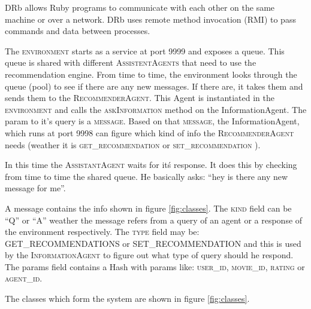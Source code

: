 \documentclass[11pt,a4paper]{article} %
\begin{document}
DRb allows Ruby programs to communicate with each other on the same machine or over a network. DRb uses remote method invocation (RMI) to pass commands and data between processes.

The \textsc{environment} starts as a service at port 9999 and exposes a queue. This queue is shared with different \textsc{AssistentAgents} that need to use the recommendation engine. From time to time, the environment looks through the queue (pool) to see if there are any new messages. If there are, it takes them and sends them to the \textsc{RecommenderAgent}. This Agent is instantiated in the \textsc{environment} and calls the \textsc{askInformation} method on the InformationAgent. The param to it's query is a \textsc{message}. Based on that \textsc{message}, the InformationAgent, which runs at port 9998 can figure which kind of info the \textsc{RecommenderAgent} needs (weather it is \textsc{get\_recommendation} or \textsc{set\_recommendation} ).

In this time the \textsc{AssistantAgent} waits for it\'s response. It does this by checking from time to time the shared queue. He basically asks: ``hey is there any new message for me''.

A message contains the info shown in figure \ref{fig:classes}. The \textsc{kind} field can be ``Q'' or ``A'' weather the message refers from a query of an agent or a response of the environment respectively. The \textsc{type} field may be: \textsc{GET\_RECOMMENDATIONS} or \textsc{SET\_RECOMMENDATION} and this is used by the \textsc{InformationAgent} to figure out what type of query should he respond. The params field contains a Hash with params like: \textsc{user\_id}, \textsc{movie\_id}, \textsc{rating} or \textsc{agent\_id}.

The classes which form the system are shown in figure \ref{fig:classes}.
\end{document}
